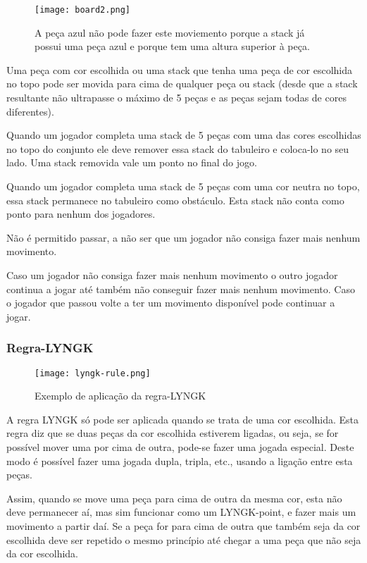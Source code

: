 \documentclass[a4paper]{article}
\begin{document}
\begin{wrapfigure}{R}{0.3\textwidth}
\texttt{[image: board2.png]}
\caption{\label{fig:Board2} A peça azul não pode fazer este moviemento porque a stack já possui uma peça azul e porque tem uma altura superior à peça.}
\end{wrapfigure}

Uma peça com cor escolhida ou uma stack que tenha uma peça de cor escolhida no topo pode ser movida para cima de qualquer peça ou stack (desde que a stack resultante não ultrapasse o máximo de 5 peças e as peças sejam todas de cores diferentes).

Quando um jogador completa uma stack de 5 peças com uma das cores escolhidas no topo do conjunto ele deve remover essa stack do tabuleiro e coloca-lo no seu lado. Uma stack removida vale um ponto no final do jogo.

Quando um jogador completa uma stack de 5 peças com uma cor neutra no topo, essa stack permanece no tabuleiro como obstáculo. Esta stack não conta como ponto para nenhum dos jogadores.

Não é permitido passar, a não ser que um jogador não consiga fazer mais nenhum movimento.

Caso um jogador não consiga fazer mais nenhum movimento o outro jogador continua a jogar até também não conseguir fazer mais nenhum movimento. Caso o jogador que passou volte a ter um movimento disponível pode continuar a jogar.


\subsubsection{Regra-LYNGK}

\begin{wrapfigure}{R}{0.3\textwidth}
\texttt{[image: lyngk-rule.png]}
\caption{\label{fig:LYNGKrule} Exemplo de aplicação da regra-LYNGK}
\end{wrapfigure}

A regra LYNGK só pode ser aplicada quando se trata de uma cor escolhida. Esta regra diz que se duas peças da cor escolhida estiverem ligadas, ou seja, se for possível mover uma por cima de outra, pode-se fazer uma jogada especial. Deste modo é possível fazer uma jogada dupla, tripla, etc., usando a ligação entre esta peças.

Assim, quando se move uma peça para cima de outra da mesma cor, esta não deve permanecer aí, mas sim funcionar como um LYNGK-point, e fazer mais um movimento a partir daí. Se a peça for para cima de outra que também seja da cor escolhida deve ser repetido o mesmo princípio até chegar a uma peça que não seja da cor escolhida.
\end{document}
